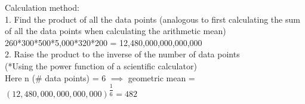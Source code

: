 		Calculation method:\\
		1.	Find the product of all the data points (analogous to first calculating the sum of all the data points when calculating the arithmetic mean)\\
		260*300*500*5,000*320*200 = 12,480,000,000,000,000\\
		2.	Raise the product to the inverse of the number of data points\\
		(*Using the power function of a scientific calculator)\\
		Here n (\# data points) = 6 $\implies$ geometric mean = $(12,480,000,000,000,000)^{\dfrac{1}{6}}   = 482$

%
%
%
%
%
%
%
%
%
%
%
%
%
%
%
%
